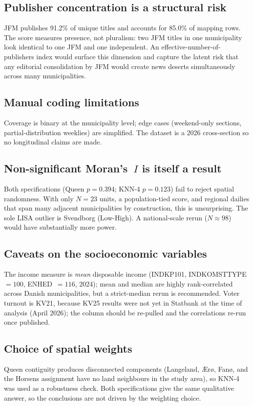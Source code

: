 \documentclass[12pt, a4paper]{article}
\begin{document}
\subsection{Publisher concentration is a structural risk}
JFM publishes 91.2\% of unique titles and accounts for 85.0\% of mapping rows. The
score measures presence, not pluralism: two JFM titles in one municipality look
identical to one JFM and one independent. An effective-number-of-publishers index
would surface this dimension and capture the latent risk that any editorial
consolidation by JFM would create news deserts simultaneously across many
municipalities.

\subsection{Manual coding limitations}
Coverage is binary at the municipality level; edge cases (weekend-only sections, partial-distribution weeklies) are simplified. The dataset is a 2026 cross-section so no longitudinal claims are made.

\subsection{Non-significant Moran's~$I$ is itself a result}
Both specifications (Queen $p = 0.394$; KNN-4 $p = 0.123$) fail to reject spatial
randomness. With only $N = 23$ units, a population-tied score, and regional dailies
that span many adjacent municipalities by construction, this is unsurprising. The
sole LISA outlier is Svendborg (Low-High). A national-scale rerun ($N \approx 98$)
would have substantially more power.

\subsection{Caveats on the socioeconomic variables}
The income measure is \emph{mean} disposable income (INDKP101,
INDKOMSTTYPE~$=100$, ENHED~$=116$, 2024); mean and median are highly
rank-correlated across Danish municipalities, but a strict-median rerun is
recommended. Voter turnout is KV21, because KV25 results were not yet in Statbank
at the time of analysis (April 2026); the column should be re-pulled and the
correlations re-run once published.

\subsection{Choice of spatial weights}
Queen contiguity produces disconnected components (Langeland, Ærø, Fanø, and the
Horsens assignment have no land neighbours in the study area), so KNN-4 was used
as a robustness check. Both specifications give the same qualitative answer, so
the conclusions are not driven by the weighting choice.
\end{document}
